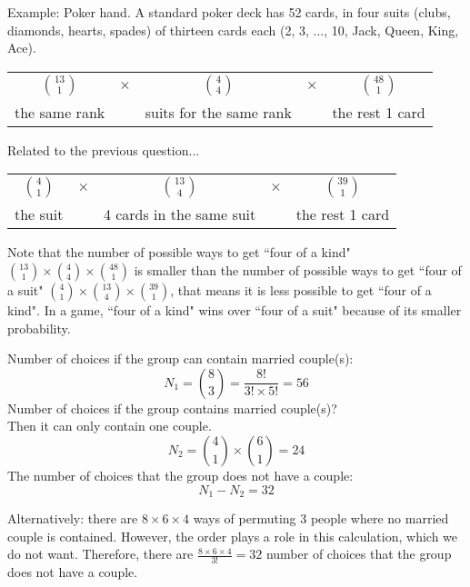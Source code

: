 \documentclass[slidestop,compress,mathserif]{beamer}
\begin{document}
\begin{frame}%
Example: Poker hand. A standard poker deck has 52 cards, in four suits (clubs, diamonds, hearts, spades) of thirteen cards each (2, 3, ..., 10, Jack, Queen, King, Ace).

\pause
\vspace{0.5cm}
\begin{tabular}{c c c c c}
$ {13 \choose 1}$ & $\times$ & ${4 \choose 4}$ & $\times$ & ${48 \choose 1}$\\
the same rank &&  suits for the same rank && the rest 1 card
\end{tabular}
\end{frame}


\begin{frame}%
Related to the previous question...
\pause
\vspace{0.5cm}
\begin{tabular}{c c c c c}
$ {4 \choose 1}$ & $\times$ & ${13 \choose 4}$ & $\times$ & ${39 \choose 1}$\\
the suit &&  4 cards in the same suit && the rest 1 card
\end{tabular}

\pause
\vspace{10mm}
Note that the number of possible ways to get ``four of a kind" ${13 \choose 1} \times {4 \choose 4} \times {48 \choose 1}$ is smaller than the number of possible ways to get ``four of a suit" $ {4 \choose 1} \times {13 \choose 4} \times {39 \choose 1}$, that means it is less possible to get ``four of a kind". In a game, ``four of a kind" wins over ``four of a suit" because of its smaller probability.
\end{frame}


\begin{frame}
\pause
{\small{
Number of choices if the group can contain married couple(s):
\[
N_1 = {8 \choose 3} = \frac{8!}{3! \times 5!} = 56
\]
\pause
Number of choices if the group contains married couple(s)? \\
Then it can only contain one couple.
\[
N_2 = {4 \choose 1} \times {6 \choose 1} = 24
\]
\pause
The number of choices that the group does not have a couple:
\[
N_1 - N_2 = 32
\]

\pause
Alternatively: there are $8 \times 6 \times 4$ ways of permuting 3 people where no married couple is contained. However, the order plays a role in this calculation, which we do not want. Therefore, there are $\frac{8 \times 6 \times 4}{3!} = 32$ number of choices that the group does not have a couple.

}}
\end{frame}
\end{document}

